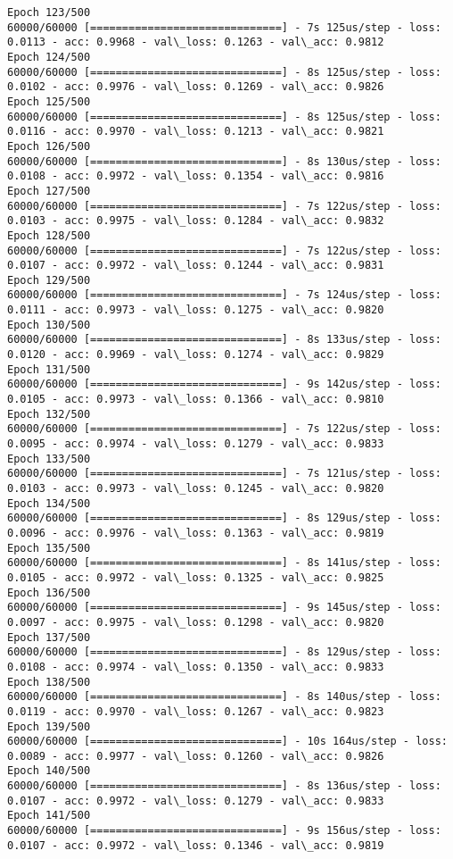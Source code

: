\documentclass[11pt]{article}
\begin{document}
\begin{Verbatim}[commandchars=\\\{\}]
Epoch 123/500
60000/60000 [==============================] - 7s 125us/step - loss: 0.0113 - acc: 0.9968 - val\_loss: 0.1263 - val\_acc: 0.9812
Epoch 124/500
60000/60000 [==============================] - 8s 125us/step - loss: 0.0102 - acc: 0.9976 - val\_loss: 0.1269 - val\_acc: 0.9826
Epoch 125/500
60000/60000 [==============================] - 8s 125us/step - loss: 0.0116 - acc: 0.9970 - val\_loss: 0.1213 - val\_acc: 0.9821
Epoch 126/500
60000/60000 [==============================] - 8s 130us/step - loss: 0.0108 - acc: 0.9972 - val\_loss: 0.1354 - val\_acc: 0.9816
Epoch 127/500
60000/60000 [==============================] - 7s 122us/step - loss: 0.0103 - acc: 0.9975 - val\_loss: 0.1284 - val\_acc: 0.9832
Epoch 128/500
60000/60000 [==============================] - 7s 122us/step - loss: 0.0107 - acc: 0.9972 - val\_loss: 0.1244 - val\_acc: 0.9831
Epoch 129/500
60000/60000 [==============================] - 7s 124us/step - loss: 0.0111 - acc: 0.9973 - val\_loss: 0.1275 - val\_acc: 0.9820
Epoch 130/500
60000/60000 [==============================] - 8s 133us/step - loss: 0.0120 - acc: 0.9969 - val\_loss: 0.1274 - val\_acc: 0.9829
Epoch 131/500
60000/60000 [==============================] - 9s 142us/step - loss: 0.0105 - acc: 0.9973 - val\_loss: 0.1366 - val\_acc: 0.9810
Epoch 132/500
60000/60000 [==============================] - 7s 122us/step - loss: 0.0095 - acc: 0.9974 - val\_loss: 0.1279 - val\_acc: 0.9833
Epoch 133/500
60000/60000 [==============================] - 7s 121us/step - loss: 0.0103 - acc: 0.9973 - val\_loss: 0.1245 - val\_acc: 0.9820
Epoch 134/500
60000/60000 [==============================] - 8s 129us/step - loss: 0.0096 - acc: 0.9976 - val\_loss: 0.1363 - val\_acc: 0.9819
Epoch 135/500
60000/60000 [==============================] - 8s 141us/step - loss: 0.0105 - acc: 0.9972 - val\_loss: 0.1325 - val\_acc: 0.9825
Epoch 136/500
60000/60000 [==============================] - 9s 145us/step - loss: 0.0097 - acc: 0.9975 - val\_loss: 0.1298 - val\_acc: 0.9820
Epoch 137/500
60000/60000 [==============================] - 8s 129us/step - loss: 0.0108 - acc: 0.9974 - val\_loss: 0.1350 - val\_acc: 0.9833
Epoch 138/500
60000/60000 [==============================] - 8s 140us/step - loss: 0.0119 - acc: 0.9970 - val\_loss: 0.1267 - val\_acc: 0.9823
Epoch 139/500
60000/60000 [==============================] - 10s 164us/step - loss: 0.0089 - acc: 0.9977 - val\_loss: 0.1260 - val\_acc: 0.9826
Epoch 140/500
60000/60000 [==============================] - 8s 136us/step - loss: 0.0107 - acc: 0.9972 - val\_loss: 0.1279 - val\_acc: 0.9833
Epoch 141/500
60000/60000 [==============================] - 9s 156us/step - loss: 0.0107 - acc: 0.9972 - val\_loss: 0.1346 - val\_acc: 0.9819

\end{Verbatim}
\end{document}
